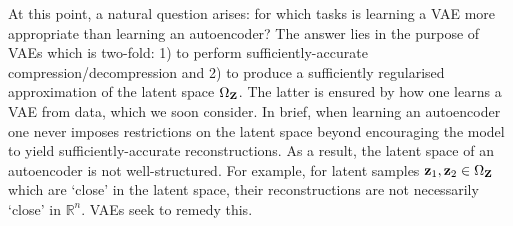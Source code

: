 \documentclass[11pt]{article}
\begin{document}
At this point, a natural question arises: for which tasks is learning a VAE more appropriate than learning an autoencoder? The answer lies in the purpose of VAEs which is two-fold: 1) to perform sufficiently-accurate compression/decompression and 2) to produce a sufficiently regularised approximation of the latent space $\Omega_{\mathbf{Z}}$. The latter is ensured by how one learns a VAE from data, which we soon consider. In brief, when learning an autoencoder one never imposes restrictions on the latent space beyond encouraging the model to yield sufficiently-accurate reconstructions. As a result, the latent space of an autoencoder is not well-structured. For example, for latent samples $\mathbf{z}_1,\mathbf{z}_2\in\Omega_{\mathbf{Z}}$ which are `close' in the latent space, their reconstructions are not necessarily `close' in $\mathbb{R}^n$. VAEs seek to remedy this.
\end{document}
